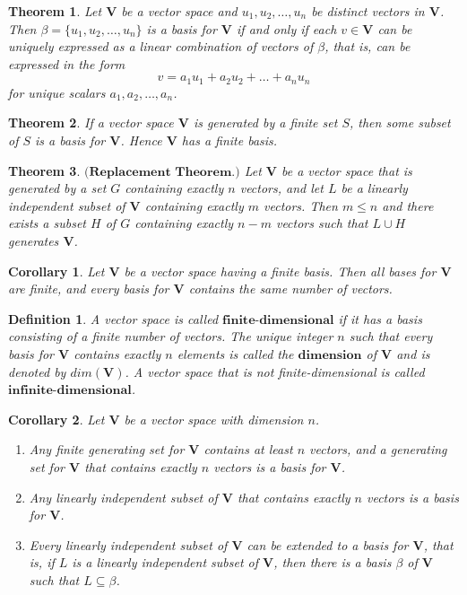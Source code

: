 \documentclass{article}
\newtheorem{theorem}{Theorem}
\newtheorem*{definition}{Definition}
\newtheorem*{corollary}{Corollary}
\begin{document}
\begin{theorem}
    Let $\textbf{V}$ be a vector space and $u_1, u_2, \dots, u_n$ be distinct vectors in $\textbf{V}$. Then $\beta = \{u_1, u_2, \dots, u_n\}$ is a basis for $\textbf{V}$ if and only if each $v\in\textbf{V}$ can be uniquely expressed as a linear combination of vectors of $\beta$, that is, can be expressed in the form \[v = a_1u_1 + a_2u_2 + \dots + a_nu_n\] for unique scalars $a_1, a_2, \dots, a_n$.
\end{theorem}

\begin{theorem}
    If a vector space $\textbf{V}$ is generated by a finite set $S$, then some subset of $S$ is a basis for $\textbf{V}$. Hence $\textbf{V}$ has a finite basis.
\end{theorem}

\begin{theorem}
    $\textbf{(Replacement Theorem.)}$ Let $\textbf{V}$ be a vector space that is generated by a set $G$ containing exactly $n$ vectors, and let $L$ be a linearly independent subset of $\textbf{V}$ containing exactly $m$ vectors. Then $m \le n$ and there exists a subset $H$ of $G$ containing exactly $n-m$ vectors such that $L \cup H$ generates $\textbf{V}$.
\end{theorem}

\begin{corollary}
    Let $\textbf{V}$ be a vector space having a finite basis. Then all bases for $\textbf{V}$ are finite, and every basis for $\textbf{V}$ contains the same number of vectors.
\end{corollary}

\begin{definition}
    A vector space is called $\textbf{finite-dimensional}$ if it has a basis consisting of a finite number of vectors. The unique integer $n$ such that every basis for $\textbf{V}$ contains exactly $n$ elements is called the $\textbf{dimension}$ of $\textbf{V}$ and is denoted by $dim(\textbf{V})$. A vector space that is not finite-dimensional is called $\textbf{infinite-dimensional}$.
\end{definition}

\begin{corollary}
    Let $\textbf{V}$ be a vector space with dimension $n$.
    \begin{enumerate}
        \item[(a)] Any finite generating set for $\textbf{V}$ contains at least $n$ vectors, and a generating set for $\textbf{V}$ that contains exactly $n$ vectors is a basis for $\textbf{V}$.
        \item[(b)] Any linearly independent subset of $\textbf{V}$ that contains exactly $n$ vectors is a basis for $\textbf{V}$.
        \item[(c)] Every linearly independent subset of $\textbf{V}$ can be extended to a basis for $\textbf{V}$, that is, if $L$ is a linearly independent subset of $\textbf{V}$, then there is a basis $\beta$ of $\textbf{V}$ such that $L\subseteq \beta$.
    \end{enumerate}
\end{corollary}
\end{document}
